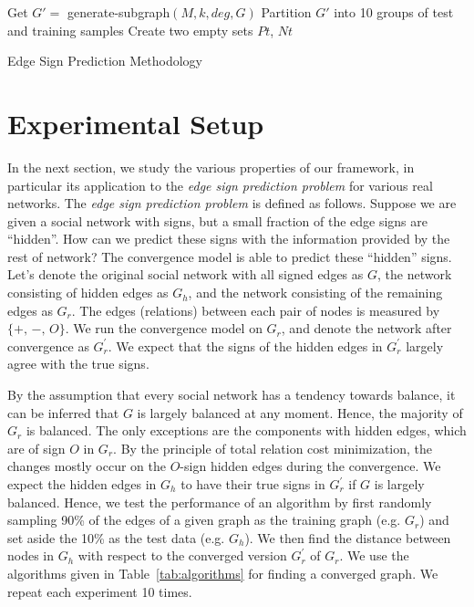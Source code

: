 \documentclass[acmtweb]{acmsmall}
\begin{document}
\begin{algorithm}\label{alg}
 Get $G'=$ generate-subgraph$(M, k, deg, G)$\;
 Partition $G'$ into 10 groups of test and training samples\;
 Create two empty sets $Pt$, $Nt$\;
 \caption{Edge Sign Prediction Methodology}
\end{algorithm}



\section{Experimental Setup} \label{sec:setup}
In the next section, we study the various properties of our framework,
in particular its application to the {\it edge sign prediction
  problem} for various real networks.  The {\it edge sign prediction
  problem} is defined as follows. Suppose we are given a social
network with signs, but a small fraction of the edge signs are
``hidden''. How can we predict these signs with the information
provided by the rest of network?  The convergence model is able to
predict these ``hidden'' signs. Let's denote the original social
network with all signed edges as $G$, the network consisting of hidden
edges as $G_{h}$, and the network consisting of the remaining edges as
$G_{r}$. The edges (relations) between each pair of nodes is measured
by $\{+,\,-,\,O\}$. We run the convergence model on $G_{r}$, and
denote the network after convergence as $G_{r}^{'}$. We expect that
the signs of the hidden edges in $G_{r}^{'}$ largely agree with the
true signs.

By the assumption that every social network has a tendency towards
balance, it can be inferred that $G$ is largely balanced at any
moment. Hence, the majority of $G_{r}$ is balanced. The only
exceptions are the components with hidden edges, which are of sign $O$
in $G_{r}$. By the principle of total relation cost minimization, the
changes mostly occur on the $O$-sign hidden edges during the
convergence. We expect the hidden edges in $G_h$ to have their true
signs in $G_{r}^{'}$ if $G$ is largely balanced. Hence, we test the
performance of an algorithm by first randomly sampling 90\% of the
edges of a given graph as the training graph (e.g. $G_{r}$) and set
aside the 10\% as the test data (e.g. $G_h$). We then find the
distance between nodes in $G_h$ with respect to the converged version
$G_{r}^{'}$ of $G_r$. We use the algorithms given in
Table~\ref{tab:algorithms} for finding a converged graph. We repeat
each experiment 10 times.
\end{document}
